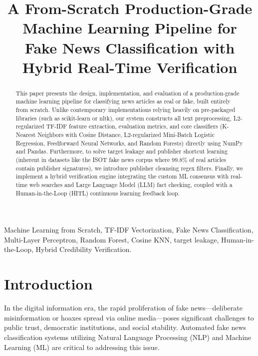 \documentclass[conference]{IEEEtran}
\begin{document}
\title{A From-Scratch Production-Grade Machine Learning Pipeline for Fake News Classification with Hybrid Real-Time Verification\\
}

\author{
}

\maketitle

\begin{abstract}
This paper presents the design, implementation, and evaluation of a production-grade machine learning pipeline for classifying news articles as real or fake, built entirely from scratch. Unlike contemporary implementations relying heavily on pre-packaged libraries (such as scikit-learn or nltk), our system constructs all text preprocessing, L2-regularized TF-IDF feature extraction, evaluation metrics, and core classifiers (K-Nearest Neighbors with Cosine Distance, L2-regularized Mini-Batch Logistic Regression, Feedforward Neural Networks, and Random Forests) directly using NumPy and Pandas. Furthermore, to solve target leakage and publisher shortcut learning (inherent in datasets like the ISOT fake news corpus where 99.8\% of real articles contain publisher signatures), we introduce publisher cleansing regex filters. Finally, we implement a hybrid verification engine integrating the custom ML consensus with real-time web searches and Large Language Model (LLM) fact checking, coupled with a Human-in-the-Loop (HITL) continuous learning feedback loop.
\end{abstract}

\begin{IEEEkeywords}
Machine Learning from Scratch, TF-IDF Vectorization, Fake News Classification, Multi-Layer Perceptron, Random Forest, Cosine KNN, target leakage, Human-in-the-Loop, Hybrid Credibility Verification.
\end{IEEEkeywords}

\section{Introduction}
In the digital information era, the rapid proliferation of fake news---deliberate misinformation or hoaxes spread via online media---poses significant challenges to public trust, democratic institutions, and social stability. Automated fake news classification systems utilizing Natural Language Processing (NLP) and Machine Learning (ML) are critical to addressing this issue.
\end{document}
